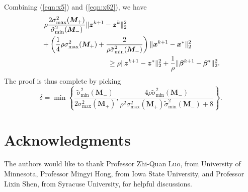 \documentclass[journal]{IEEEtran}
\newcommand{\nn}{\nonumber}
\begin{document}
\begin{IEEEproof}
Combining (\ref{eqn:x5}) and (\ref{eqn:x62}), we have 
\begin{align}
&~\rho\frac{2\sigma_{\max}^2(\bm M_+)}{{\tilde{\sigma}}_{\min}^2(\bm M_-)}\|\bm z^{k+1}-\bm z^k\|_2^2\nn\\&+\left(\frac{1}{4}\rho\sigma_{\max}^2(\bm M_+)+\frac{2}{{\rho\tilde{\sigma}}_{\min}^2(\bm M_-)}\right)\|\bm x^{k+1}-\bm x^*\|_2^2\nn\\
&\hspace{1.3in}\geq\rho\|\bm z^{k+1}-\bm z^*\|_2^2+\frac{1}{\rho}\|\bm\beta^{k+1}-\bm\beta^*\|_2^2.\nn
\end{align}
The proof is thus complete by picking 
$$\delta = \min\left\{\frac{{\tilde{\sigma}}_{\min}^2(\bm M_-)}{2\sigma_{\max}^2(\bm M_+)}, \frac{4\rho{\tilde{\sigma}}_{\min}^2(\bm M_-)}{\rho^2\sigma_{\max}^2(\bm M_+){\tilde{\sigma}}_{\min}^2(\bm M_-)+ 8}\right\}.$$
\end{IEEEproof}



\section*{Acknowledgments}
The authors would like to thank Professor Zhi-Quan Luo, from University of Minnesota, Professor Mingyi Hong, from Iowa State University, and Professor Lixin Shen, from Syracuse University, for helpful discussions.




\end{document}
